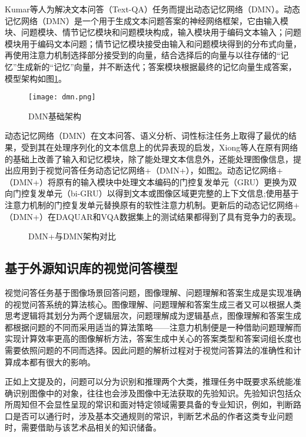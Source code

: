 Kumar等人为解决文本问答（Text-QA）任务而提出动态记忆网络（DMN）。动态记忆网络（DMN）是一个用于生成文本问题答案的神经网络框架，它由输入模块、问题模块、情节记忆模块和问题模块构成，输入模块用于编码文本输入；问题模块用于编码文本问题；情节记忆模块接受由输入和问题模块得到的分布式向量，再使用注意力机制选择部分接受到的向量，结合选择后的向量与以往存储的“记忆”生成新的“记忆”向量，并不断迭代；答案模块根据最终的记忆向量生成答案，模型架构如图\ref{dmn}。
\begin{figure}[H]
	\centering
	\texttt{[image: dmn.png]}
	\caption{DMN基础架构}
	\label{dmn}
\end{figure}

动态记忆网络（DMN）在文本问答、语义分析、词性标注任务上取得了最优的结果，受到其在处理序列化的文本信息上的优异表现的启发，Xiong等人在原有网络的基础上改善了输入和记忆模块，除了能处理文本信息外，还能处理图像信息，提出应用到于视觉问答任务动态记忆网络+（DMN+），如图\ref{v-dmn}。动态记忆网络+（DMN+）将原有的输入模块中处理文本编码的门控复发单元（GRU）更换为双向门控复发单元（bi-GRU）以得到文本或图像区域更完整的上下文信息;使用基于注意力机制的门控复发单元替换原有的软性注意力机制。更新后的动态记忆网络+（DMN+）在DAQUAR和VQA数据集上的测试结果都得到了具有竞争力的表现。
\begin{figure}[H]
	\centering
	\caption{DMN+与DMN架构对比}
	\label{v-dmn}
\end{figure}

\subsection{基于外源知识库的视觉问答模型}
视觉问答任务基于图像场景回答问题，图像理解、问题理解和答案生成是实现准确的视觉问答系统的算法核心。图像理解、问题理解和答案生成三者又可以根据人类思考逻辑将其划分为两个逻辑层次，问题理解成为逻辑基点，图像理解和答案生成都根据问题的不同而采用适当的算法策略——注意力机制便是一种借助问题理解而实现计算效率更高的图像解析方法，答案生成中关心的答案类型和答案词组长度也需要依照问题的不同而选择。因此问题的解析过程对于视觉问答算法的准确性和计算成本都有很大的影响。

正如上文提及的，问题可以分为识别和推理两个大类，推理任务中既要求系统能准确识别图像中的对象，往往也会涉及图像中无法获取的先验知识。先验知识包括众所周知但不会显性呈现的常识和面对特定领域需要具备的专业知识，例如，判断路口是否可以通行时，涉及基本交通规则的常识，判断艺术品的作者这类专业问题时，需要借助与该艺术品相关的知识储备。

